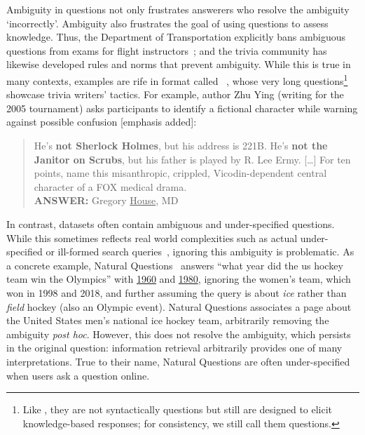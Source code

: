 Ambiguity in questions not only frustrates answerers who resolve the ambiguity `incorrectly'.
Ambiguity also frustrates the goal of using questions to assess knowledge.
Thus, the  Department of Transportation explicitly bans ambiguous questions from exams for flight instructors~\citep{dot-08}; and the trivia community has likewise developed rules and norms that prevent ambiguity.
While this is true in many contexts, examples are rife in format called \qb{}~\citep{boyd-graber-12}, whose very long questions\footnote{Like \jeopardy{}, they are not syntactically questions but still are designed to elicit knowledge-based responses; for consistency, we still call them questions.} showcase trivia writers' tactics.
For example, \qb{} author Zhu Ying (writing for the 2005  tournament) asks participants to identify a fictional character while warning against possible confusion [emphasis added]:
\begin{quote}
 He's {\bf not Sherlock Holmes}, but his address is 221B. He's {\bf not the Janitor on Scrubs}, but his father is played by R. Lee Ermy. [\dots] For ten points, name this misanthropic, crippled, Vicodin-dependent central character of a FOX medical drama. \\
{\bf ANSWER:} Gregory \underline{House}, MD
\end{quote}

In contrast, \qa{} datasets often contain ambiguous and
under-specified questions.
While this sometimes reflects real world complexities such as actual
under-specified or ill-formed search
queries~\citep{faruqui-18,kwiatkowski-19}, ignoring this ambiguity is
problematic.
As a concrete example, Natural Questions~\citep{kwiatkowski-19} answers ``what year did the us hockey team win the Olympics'' with \underline{1960} and \underline{1980}, ignoring the  women's team, which won in 1998 and 2018, and further assuming the query is about \emph{ice} rather than \emph{field} hockey (also an Olympic event).
Natural Questions associates a page about the United States men's national ice hockey team, arbitrarily removing the ambiguity \textit{post hoc}.
However, this does not resolve the ambiguity, which persists in the original question: information retrieval arbitrarily provides one of many interpretations.
True to their name, Natural Questions are often under-specified when users ask a question online.

